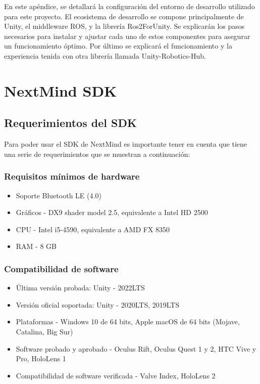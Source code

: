 En este apéndice, se detallará la configuración del entorno de desarrollo utilizado para este proyecto. El ecosistema de desarrollo se compone principalmente de Unity, el middleware ROS, y la librería Ros2ForUnity. Se explicarán los pasos necesarios para instalar y ajustar cada uno de estos componentes para asegurar un funcionamiento óptimo. Por último se explicará el funcionamiento y la experiencia tenida con otra librería llamada Unity-Robotics-Hub.


\section{NextMind SDK}

\subsection{Requerimientos del SDK}
Para poder usar el SDK de NextMind es importante tener en cuenta que tiene una serie de requerimientos que se muestran a continuación:

\subsubsection{Requisitos mínimos de hardware}
\begin{itemize}
  \item Soporte Bluetooth LE (4.0)
  \item Gráficos - DX9 shader model 2.5, equivalente a Intel HD 2500
  \item CPU - Intel i5-4590, equivalente a AMD FX 8350
  \item RAM - 8 GB
\end{itemize}

\subsubsection{Compatibilidad de software}
\begin{itemize}
  \item Última versión probada: Unity - 2022LTS
  \item Versión oficial soportada: Unity - 2020LTS, 2019LTS
  \item Plataformas - Windows 10 de 64 bits, Apple macOS de 64 bits (Mojave, Catalina, Big Sur)
  \item Software probado y aprobado - Oculus Rift, Oculus Quest 1 y 2, HTC Vive y Pro, HoloLens 1
  \item Compatibilidad de software verificada - Valve Index, HoloLens 2
\end{itemize}

